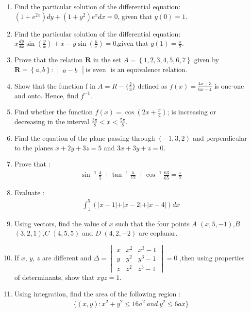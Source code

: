 \documentclass[10pt,-letter paper]{article}
\providecommand{\cbrak}[1]{\ensuremath{\left\{#1\right\}}}
\providecommand{\brak}[1]{\ensuremath{\left(#1\right)}}
\newcommand{\mydet}[1]{\ensuremath{\begin{vmatrix}#1\end{vmatrix}}}
\begin{document}
\begin{enumerate}
\item Find the particular solution of the differential equation: $\brak{1+e^{2x}}{dy}+\brak{1+y^2}{e^{x}dx}=0$, given that $y\brak0=1$.

\item Find the particular solution of the differential equation: $x\frac{dy}{dx}\sin\brak{\frac{y}{x}}+x-y\sin\brak{\frac{y}{x}}=0$,given that $y\brak1=\frac{\pi}{2}$.

\item Prove that the relation $\mathbf{R}$ in the set $A = \cbrak{1,2,3,4,5,6,7}$ given by $\mathbf{R}=\cbrak{a,b}:\mydet{a-b}\text {is even }$ is an equivalence relation.

\item Show that the function f in $A = R-\{\frac{2}{3}\}$ defined as $f\brak{x} = \frac{4x+3}{6x-4}$ is one-one and onto. Hence, find $f^{-1}$.

\item Find whether the function $f\brak{x}=\cos \brak{{2x}+{\frac{\pi}{4}}}$; is increasing or decreasing in the interval $\frac{3\pi}{8}<x<\frac{5\pi}{8}$.

\item Find the equation of the plane passing through $\brak{-1,3,2}$ and perpendicular to the planes $x+2y+3z=5$ and $3x+3y+z=0$.

\item Prove that :\begin{align*}\sin^{-1}\frac{4}{5}+\tan^{-1}\frac{5}{12}+\cos^{-1}\frac{63}{65}=\frac{\pi}{2}\end{align*}

\item Evaluate :\begin{align*}\int_{1}^{5} \brak{\vert{x-1}\vert+\vert{x-2}\vert+\vert{x-4}\vert} dx\end{align*}

\item Using vectors, find the value of $x$ such that the four points $A$ $\brak{x,5,-1}$,$B$ $\brak{3,2,1}$,$C$ $\brak{4,5,5}$ and $D$ $\brak{4,2,-2}$ are coplanar.

\item If $x$, $y$, $z$ are different and $\Delta=\mydet{x & x^2 & x^3 -1\\y & y^2 & y^3 -1\\z & z^2 & z^3 -1} = 0$ ,then using properties of determinants, show that $xyz = 1$.

\item Using integration, find the area of the following region :
\begin{align*}\{\brak{x,y} :x^2+y^2\leq16a^2~and~y^2\leq6ax\}
\end{align*}


\end{enumerate}
\end{document}
